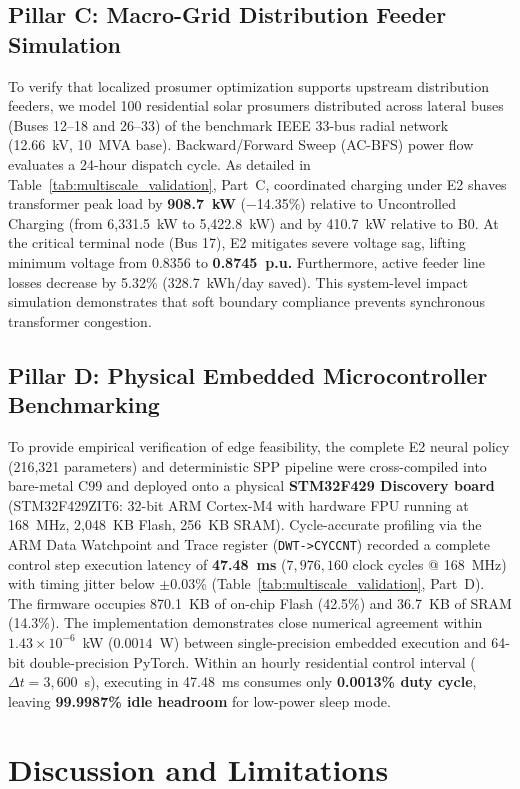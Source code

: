 \documentclass[journal]{IEEEtran}
\theoremstyle{remark}
\begin{document}
\subsection{Pillar C: Macro-Grid Distribution Feeder Simulation}
To verify that localized prosumer optimization supports upstream distribution feeders, we model 100 residential solar prosumers distributed across lateral buses (Buses 12--18 and 26--33) of the benchmark IEEE 33-bus radial network (12.66~kV, 10~MVA base). Backward/Forward Sweep (AC-BFS) power flow evaluates a 24-hour dispatch cycle. As detailed in Table~\ref{tab:multiscale_validation}, Part~C, coordinated charging under E2 shaves transformer peak load by \textbf{908.7~kW} ($-$14.35\%) relative to Uncontrolled Charging (from 6,331.5~kW to 5,422.8~kW) and by 410.7~kW relative to B0. At the critical terminal node (Bus 17), E2 mitigates severe voltage sag, lifting minimum voltage from 0.8356 to \textbf{0.8745~p.u.} Furthermore, active feeder line losses decrease by 5.32\% (328.7~kWh/day saved). This system-level impact simulation demonstrates that soft boundary compliance prevents synchronous transformer congestion.

\subsection{Pillar D: Physical Embedded Microcontroller Benchmarking}
To provide empirical verification of edge feasibility, the complete E2 neural policy (216,321 parameters) and deterministic SPP pipeline were cross-compiled into bare-metal C99 and deployed onto a physical \textbf{STM32F429 Discovery board} (STM32F429ZIT6: 32-bit ARM Cortex-M4 with hardware FPU running at 168~MHz, 2,048~KB Flash, 256~KB SRAM). Cycle-accurate profiling via the ARM Data Watchpoint and Trace register (\texttt{DWT->CYCCNT}) recorded a complete control step execution latency of \textbf{47.48~ms} ($7,976,160$ clock cycles @ 168~MHz) with timing jitter below $\pm 0.03\%$ (Table~\ref{tab:multiscale_validation}, Part~D). The firmware occupies 870.1~KB of on-chip Flash (42.5\%) and 36.7~KB of SRAM (14.3\%). The implementation demonstrates close numerical agreement within $1.43 \times 10^{-6}$~kW ($0.0014$~W) between single-precision embedded execution and 64-bit double-precision PyTorch. Within an hourly residential control interval ($\Delta t = 3,600$~s), executing in 47.48~ms consumes only \textbf{0.0013\% duty cycle}, leaving \textbf{99.9987\% idle headroom} for low-power sleep mode.

\section{Discussion and Limitations}
\end{document}
